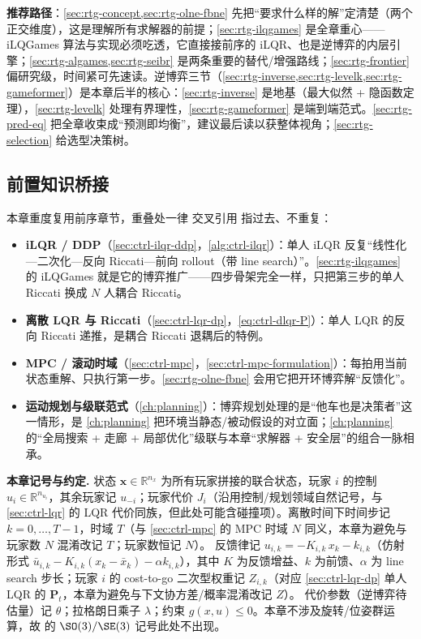 \noindent\textbf{推荐路径}：\cref{sec:rtg-concept,sec:rtg-olne-fbne} 先把“要求什么样的解”定清楚（两个正交维度），这是理解所有求解器的前提；\cref{sec:rtg-ilqgames} 是全章重心——iLQGames 算法与实现必须吃透，它直接接前序的 iLQR、也是逆博弈的内层引擎；\cref{sec:rtg-algames,sec:rtg-seibr} 是两条重要的替代/增强路线；\cref{sec:rtg-frontier} 偏研究级，时间紧可先速读。逆博弈三节（\cref{sec:rtg-inverse,sec:rtg-levelk,sec:rtg-gameformer}）是本章后半的核心：\cref{sec:rtg-inverse} 是地基（最大似然 + 隐函数定理），\cref{sec:rtg-levelk} 处理有界理性，\cref{sec:rtg-gameformer} 是端到端范式。\cref{sec:rtg-pred-eq} 把全章收束成“预测即均衡”，建议最后读以获整体视角；\cref{sec:rtg-selection} 给选型决策树。

\subsection*{前置知识桥接}
本章重度复用前序章节，重叠处一律 交叉引用 指过去、不重复：
\begin{itemize}
  \item \textbf{iLQR / DDP}（\cref{sec:ctrl-ilqr-ddp}，\cref{alg:ctrl-ilqr}）：单人 iLQR 反复“线性化—二次化—反向 Riccati—前向 rollout（带 line search）”。\cref{sec:rtg-ilqgames} 的 iLQGames 就是它的博弈推广——四步骨架完全一样，只把第三步的单人 Riccati 换成 $N$ 人耦合 Riccati。
  \item \textbf{离散 LQR 与 Riccati}（\cref{sec:ctrl-lqr-dp}，\cref{eq:ctrl-dlqr-P}）：单人 LQR 的反向 Riccati 递推，是耦合 Riccati 退耦后的特例。
  \item \textbf{MPC / 滚动时域}（\cref{sec:ctrl-mpc}，\cref{sec:ctrl-mpc-formulation}）：每拍用当前状态重解、只执行第一步。\cref{sec:rtg-olne-fbne} 会用它把开环博弈解“反馈化”。
  \item \textbf{运动规划与级联范式}（\cref{ch:planning}）：博弈规划处理的是“他车也是决策者”这一情形，是 \cref{ch:planning} 把环境当静态/被动假设的对立面；\cref{ch:planning} 的“全局搜索 + 走廊 + 局部优化”级联与本章“求解器 + 安全层”的组合一脉相承。
\end{itemize}

\begin{note}
\textbf{本章记号与约定.}\;
状态 $\mathbf{x}\in\mathbb{R}^{n_x}$ 为所有玩家拼接的联合状态，玩家 $i$ 的控制 $u_i\in\mathbb{R}^{n_{u_i}}$，其余玩家记 $u_{-i}$；玩家代价 $J_i$（沿用控制/规划领域自然记号，与 \cref{sec:ctrl-lqr} 的 LQR 代价同族，但此处可能含碰撞项）。离散时间下时间步记 $k=0,\dots,T-1$，时域 $T$（与 \cref{sec:ctrl-mpc} 的 MPC 时域 $N$ 同义，本章为避免与玩家数 $N$ 混淆改记 $T$；玩家数恒记 $N$）。
反馈律记 $u_{i,k}=-K_{i,k}\,x_k-k_{i,k}$（仿射形式 $\bar u_{i,k}-K_{i,k}(x_k-\bar x_k)-\alpha k_{i,k}$），其中 $K$ 为反馈增益、$k$ 为前馈、$\alpha$ 为 line search 步长；玩家 $i$ 的 cost-to-go 二次型权重记 $Z_{i,k}$（对应 \cref{sec:ctrl-lqr-dp} 单人 LQR 的 $\mathbf{P}_t$，本章为避免与下文协方差/概率混淆改记 $Z$）。
代价参数（逆博弈待估量）记 $\theta$；拉格朗日乘子 $\lambda$；约束 $g(x,u)\le0$。本章不涉及旋转/位姿群运算，故  的 $\SO(3)/\SE(3)$ 记号此处不出现。
\end{note}

